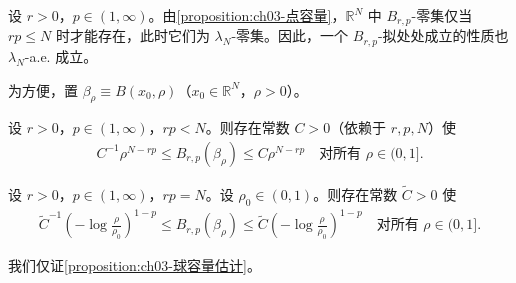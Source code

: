 \documentclass[../../main.tex]{subfiles}%
\begin{document}
\begin{remark}\label{remark:ch03-零集可测}
设 $r>0$，$p\in(1,\infty)$。由\cref{proposition:ch03-点容量}，$\mathbb{R}^N$ 中 $B_{r,p}$-零集仅当 $rp\leqslant N$ 时才能存在，此时它们为 $\lambda_N$-零集。因此，一个 $B_{r,p}$-拟处处成立的性质也 $\lambda_N$-a.e. 成立。
\end{remark}

为方便，置 $\beta_\rho\equiv B(x_0,\rho)$（$x_0\in\mathbb{R}^N$，$\rho>0$）。

\begin{proposition}\label{proposition:ch03-球容量估计}
设 $r>0$，$p\in(1,\infty)$，$rp<N$。则存在常数 $C>0$（依赖于 $r,p,N$）使
\begin{align}
C^{-1}\rho^{N-rp}\leqslant B_{r,p}(\beta_\rho)\leqslant C\rho^{N-rp}
\quad \text{对所有 }\rho\in(0,1].\label{align:ch03-3.52a}
\end{align}
\end{proposition}

\begin{proposition}\label{proposition:ch03-球容量log}
设 $r>0$，$p\in(1,\infty)$，$rp=N$。设 $\rho_0\in(0,1)$。则存在常数 $\widetilde C>0$ 使
\begin{align}
\widetilde C^{-1}\left(-\log\frac{\rho}{\rho_0}\right)^{1-p}
\leqslant B_{r,p}(\beta_\rho)
\leqslant\widetilde C\left(-\log\frac{\rho}{\rho_0}\right)^{1-p}
\quad \text{对所有 }\rho\in(0,1].\label{align:ch03-3.52b}
\end{align}
\end{proposition}

我们仅证\cref{proposition:ch03-球容量估计}。
\end{document}
